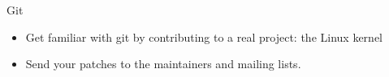 \setuplabframe
{Git}
{
  \begin{itemize}
  \item Get familiar with git by contributing to a real project: the
    Linux kernel
  \item Send your patches to the maintainers and mailing lists.
  \end{itemize}
}
